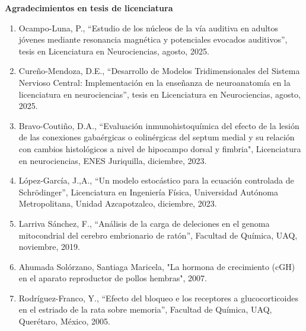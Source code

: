 {\large \textbf{\color{red}\textbf{Agradecimientos en tesis de licenciatura}}}

\begin{enumerate}

\item Ocampo-Luna, P., “Estudio de los núcleos de la vía auditiva en adultos jóvenes mediante 
resonancia magnética y potenciales evocados auditivos”, tesis en Licenciatura en Neurociencias, 
agosto, 2025.

\item  Cureño-Mendoza, D.E., “Desarrollo de Modelos Tridimensionales del Sistema Nervioso Central: 
Implementación en la enseñanza de neuroanatomía en la licenciatura en neurociencias”, tesis en 
Licenciatura en Neurociencias, agosto, 2025.

\item Bravo-Coutiño, D.A., “Evaluación inmunohistoquímica del efecto de la lesión de las conexiones gabaérgicas o colinérgicas del septum medial y su relación 
con 
cambios histológicos a nivel de hipocampo dorsal y fimbria", Licenciatura en neurociencias, ENES Juriquilla, diciembre, 2023.

\item López-García, J.,A., “Un modelo estocástico para la ecuación controlada de Schrödinger”, Licenciatura en Ingeniería Física, Universidad Autónoma 
Metropolitana, 
Unidad Azcapotzalco, diciembre, 2023.

\item Larriva Sánchez, F., “Análisis de la carga de deleciones en el genoma mitocondrial del cerebro embrionario de ratón”, Facultad de Química, UAQ,  
noviembre, 2019.

\item Ahumada Solórzano, Santiaga Maricela, "La hormona de crecimiento (cGH) en el aparato reproductor de pollos hembras",  2007.

\item Rodríguez-Franco, Y., “Efecto del bloqueo e los receptores a glucocorticoides en el estriado de la rata sobre memoria”, Facultad de Química, UAQ, 
Querétaro, México, 2005.

\end{enumerate}

